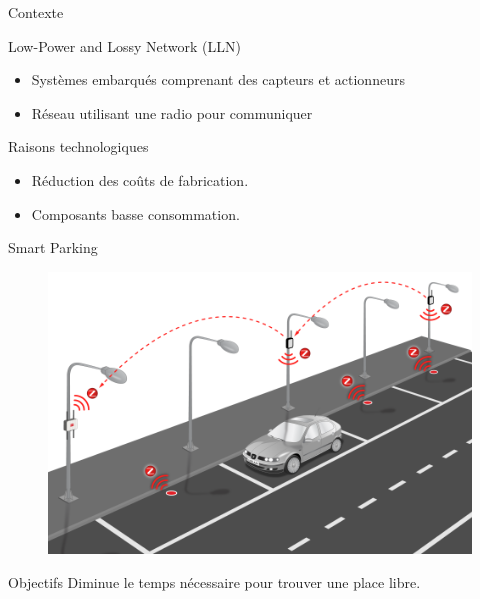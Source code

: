 \begin{frame}{Contexte}
  \begin{block}{Low-Power and Lossy Network (LLN)}
    \begin{itemize}
      \item Systèmes embarqués comprenant des capteurs et actionneurs
      \item Réseau utilisant une radio pour communiquer
    \end{itemize}
  \end{block}

  \begin{block}{Raisons technologiques}
    \begin{itemize}
      \item Réduction des coûts de fabrication.
      \item Composants basse consommation.
    \end{itemize}
  \end{block}



\end{frame}

\begin{frame}{Smart Parking}
  \begin{figure}
    \centering
    \includegraphics[width=.7\textwidth]{figures/smart_parking.png}
  \end{figure}
  \begin{block}{Objectifs}
    Diminue le temps nécessaire pour trouver une place libre.
  \end{block}
\end{frame}

